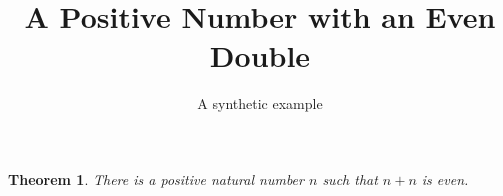 \documentclass[11pt]{article}
\title{A Positive Number with an Even Double}
\author{A synthetic example}
\date{}
\newtheorem{theorem}{Theorem}
\begin{document}
\maketitle

\begin{theorem}\label{thm:double}
There is a positive natural number $n$ such that $n + n$ is even.
\end{theorem}
\end{document}
